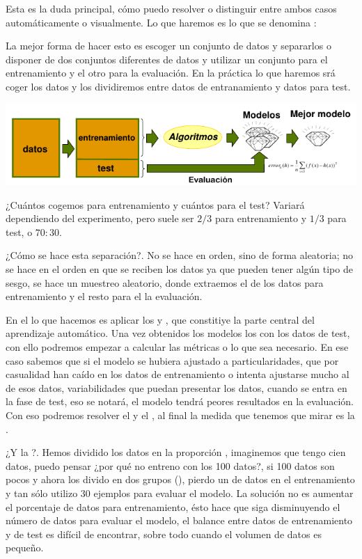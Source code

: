 Esta es la duda principal, cómo puedo resolver o distinguir entre ambos casos automáticamente o visualmente. Lo que haremos es lo que se denomina :
\begin{center}
\end{center}
La mejor forma de hacer esto es escoger un conjunto de datos y separarlos o disponer de dos conjuntos diferentes de datos y utilizar un conjunto para el entrenamiento y el otro para la evaluación. En la práctica lo que haremos srá coger los datos y los dividiremos entre datos de entranamiento y datos para test.
\begin{center}
    \includegraphics[scale=.65]{images/mod02-06.png}
\end{center}
¿Cuántos cogemos para entrenamiento y cuántos para el test? Variará dependiendo del experimento, pero suele ser $2/3$ para entrenamiento y $1/3$ para test, o $70:30$.

¿Cómo se hace esta separación?. No se hace en orden, sino  de forma aleatoria; no se hace en el orden en que se reciben los datos ya que pueden tener algún tipo de sesgo, se hace un muestreo aleatorio, donde extraemos el  de los datos para entrenamiento y el resto para el la evaluación.

En el  lo que hacemos es aplicar los  y , que constitiye la parte central del aprendizaje automático. Una vez obtenidos los modelos los  con los datos de test, con ello podremos empezar a calcular las métricas o lo que sea necesario. En ese caso sabemos que si el modelo se hubiera ajustado a particularidades, que por casualidad han caído en los datos de entrenamiento o intenta ajustarse mucho al  de esos datos, variabilidades que puedan presentar los datos, cuando se entra en la fase de test, eso se notará, el modelo tendrá peores resultados en la evaluación. Con eso podremos resolver el  y el , al final la medida que tenemos que mirar es  la .

¿Y la ?. Hemos dividido los datos en la proporción , imaginemos que tengo cien datos, puedo pensar ¿por qué no entreno con los 100 datos?, si 100 datos son pocos y ahora los divido en dos grupos (), pierdo un  de datos en el entrenamiento y tan sólo utilizo 30 ejemplos para evaluar el modelo. La solución no es aumentar el porcentaje de datos para entrenamiento, ésto hace que siga disminuyendo el número de datos para evaluar el modelo, el balance entre datos de entrenamiento y de test es difícil de encontrar, sobre todo cuando el volumen de datos es pequeño.

